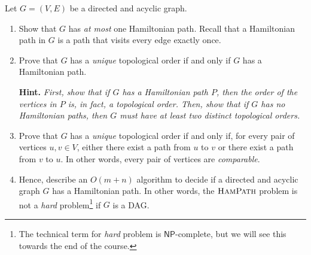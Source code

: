 \documentclass{article}
\begin{document}
\begin{question}
Let $G = (V, E)$ be a directed and acyclic graph.

\begin{enumerate}[label = (\alph*)]
    \item Show that $G$ has {\em at most} one Hamiltonian path. Recall that a Hamiltonian path in $G$ is a path that visits every edge exactly once.

    \item Prove that $G$ has a {\em unique} topological order if and only if $G$ has a Hamiltonian path.

    {\bfseries Hint.} {\em First, show that if $G$ has a Hamiltonian path $P$, then the order of the vertices in $P$ is, in fact, a topological order. Then, show that if $G$ has no Hamiltonian paths, then $G$ must have at least two distinct topological orders.}

    \item Prove that $G$ has a {\em unique} topological order if and only if, for every pair of vertices $u, v \in V$, either there exist a path from $u$ to $v$ or there exist a path from $v$ to $u$. In other words, every pair of vertices are {\em comparable}.

    \item Hence, describe an $O(m + n)$ algorithm to decide if a directed and acyclic graph $G$ has a Hamiltonian path. In other words, the $\mathsf{\textsc{HamPath}}$ problem is not a {\em hard} problem\footnote{The technical term for {\em hard} problem is $\mathsf{NP}$-complete, but we will see this towards the end of the course.} if $G$ is a DAG.
\end{enumerate}
\end{question}
\end{document}
